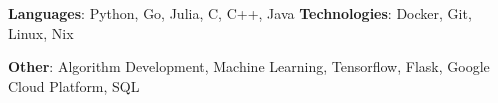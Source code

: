 \textbf{Languages}{: Python, Go, Julia, C, C++, Java}
\hfill
\textbf{Technologies}{: Docker, Git, Linux, Nix}
\vspace{3pt}

\textbf{Other}{: Algorithm Development, Machine Learning, Tensorflow, Flask, Google Cloud Platform, SQL}